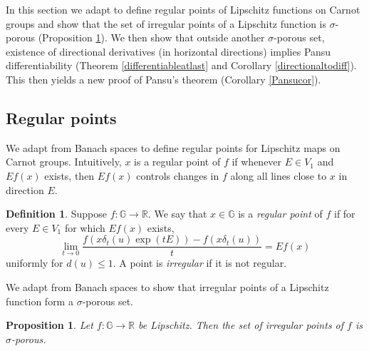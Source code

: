 \documentclass[reqno, 11pt]{amsart}
\newtheorem{proposition}[theorem]{Proposition}
\theoremstyle{definition}
\newtheorem{definition}[theorem]{Definition}
\theoremstyle{remark}
\numberwithin{theorem}{section}
\numberwithin{equation}{section}
\begin{document}
In this section we adapt \cite{LP03} to define regular points of Lipschitz functions on Carnot groups and show that the set of irregular points of a Lipschitz function is $\sigma$-porous (Proposition \ref{irregularporous}). We then show that outside another $\sigma$-porous set, existence of directional derivatives (in horizontal directions) implies Pansu differentiability (Theorem \ref{differentiableatlast} and Corollary \ref{directionaltodiff}). This then yields a new proof of Pansu's theorem (Corollary \ref{Pansucor}).

\subsection{Regular points}

We adapt \cite[Definition 3.1]{LP03} from Banach spaces to define regular points for Lipschitz maps on Carnot groups. Intuitively, $x$ is a regular point of $f$ if whenever $E\in V_{1}$ and $Ef(x)$ exists, then $Ef(x)$ controls changes in $f$ along all lines close to $x$ in direction $E$.

\begin{definition}\label{defregularpoint}
Suppose $f\colon \mathbb{G}\to \mathbb{R}$. We say that $x\in \mathbb{G}$ is a \emph{regular point} of $f$ if for every $E\in V_{1}$ for which $Ef(x)$ exists, 
\[\lim_{t\to 0} \frac{f(x\delta_{t}(u)\exp(tE))-f(x\delta_{t}(u))}{t}=Ef(x)\]
uniformly for $d(u)\leq 1$. A point is \emph{irregular} if it is not regular.
\end{definition}

We adapt \cite[Proposition 3.3]{LP03} from Banach spaces to show that irregular points of a Lipschitz function form a $\sigma$-porous set.

\begin{proposition}\label{irregularporous}
Let $f\colon \mathbb{G}\to \mathbb{R}$ be Lipschitz. Then the set of irregular points of $f$ is $\sigma$-porous.
\end{proposition}
\end{document}
